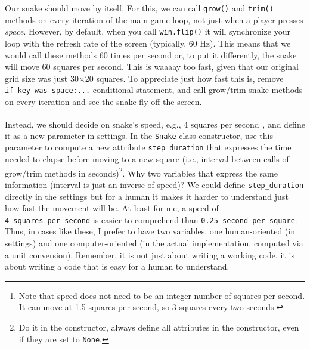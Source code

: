 \documentclass[
]{book}
\begin{document}
Our snake should move by itself. For this, we can call \texttt{grow()} and \texttt{trim()} methods on every iteration of the main game loop, not just when a player presses \emph{space}. However, by default, when you call \texttt{win.flip()} it will synchronize your loop with the refresh rate of the screen (typically, 60 Hz). This means that we would call these methods 60 times per second or, to put it differently, the snake will move 60 squares per second. This is waaaay too fast, given that our original grid size was just 30×20 squares. To appreciate just how fast this is, remove \texttt{if\ key\ was\ space:...} conditional statement, and call grow/trim snake methods on every iteration and see the snake fly off the screen.

Instead, we should decide on snake's speed, e.g., 4 squares per second\footnote{Note that speed does not need to be an integer number of squares per second. It can move at 1.5 squares per second, so 3 squares every two seconds.}, and define it as a new parameter in settings. In the \texttt{Snake} class constructor, use this parameter to compute a new attribute \texttt{step\_duration} that expresses the time needed to elapse before moving to a new square (i.e., interval between calls of grow/trim methods in seconds)\footnote{Do it in the constructor, always define all attributes in the constructor, even if they are set to \texttt{None}.}. Why two variables that express the same information (interval is just an inverse of speed)? We could define \texttt{step\_duration} directly in the settings but for a human it makes it harder to understand just how fast the movement will be. At least for me, a speed of \texttt{4\ squares\ per\ second} is easier to comprehend than \texttt{0.25\ second\ per\ square}. Thus, in cases like these, I prefer to have two variables, one human-oriented (in settings) and one computer-oriented (in the actual implementation, computed via a unit conversion). Remember, it is not just about writing a working code, it is about writing a code that is easy for a human to understand.
\end{document}
